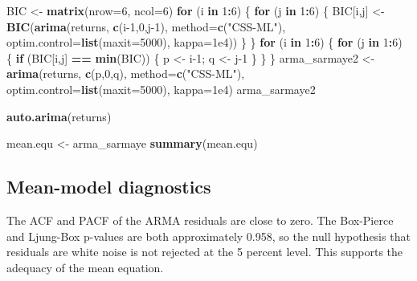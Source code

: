 \documentclass[
  11pt,
]{article}
\newenvironment{Shaded}{\begin{snugshade}}{\end{snugshade}}
\newcommand{\AttributeTok}[1]{\textcolor[rgb]{0.13,0.29,0.53}{#1}}
\newcommand{\ControlFlowTok}[1]{\textcolor[rgb]{0.13,0.29,0.53}{\textbf{#1}}}
\newcommand{\DecValTok}[1]{\textcolor[rgb]{0.00,0.00,0.81}{#1}}
\newcommand{\FloatTok}[1]{\textcolor[rgb]{0.00,0.00,0.81}{#1}}
\newcommand{\FunctionTok}[1]{\textcolor[rgb]{0.13,0.29,0.53}{\textbf{#1}}}
\newcommand{\NormalTok}[1]{#1}
\newcommand{\OtherTok}[1]{\textcolor[rgb]{0.56,0.35,0.01}{#1}}
\newcommand{\SpecialCharTok}[1]{\textcolor[rgb]{0.81,0.36,0.00}{\textbf{#1}}}
\newcommand{\StringTok}[1]{\textcolor[rgb]{0.31,0.60,0.02}{#1}}
\begin{document}
\begin{Shaded}
\begin{Highlighting}[]
\NormalTok{BIC }\OtherTok{\textless{}{-}} \FunctionTok{matrix}\NormalTok{(}\AttributeTok{nrow=}\DecValTok{6}\NormalTok{, }\AttributeTok{ncol=}\DecValTok{6}\NormalTok{)}
\ControlFlowTok{for}\NormalTok{ (i }\ControlFlowTok{in} \DecValTok{1}\SpecialCharTok{:}\DecValTok{6}\NormalTok{) \{}
  \ControlFlowTok{for}\NormalTok{ (j }\ControlFlowTok{in} \DecValTok{1}\SpecialCharTok{:}\DecValTok{6}\NormalTok{) \{}
\NormalTok{    BIC[i,j] }\OtherTok{\textless{}{-}} \FunctionTok{BIC}\NormalTok{(}\FunctionTok{arima}\NormalTok{(returns, }\FunctionTok{c}\NormalTok{(i}\DecValTok{{-}1}\NormalTok{,}\DecValTok{0}\NormalTok{,j}\DecValTok{{-}1}\NormalTok{), }\AttributeTok{method=}\FunctionTok{c}\NormalTok{(}\StringTok{"CSS{-}ML"}\NormalTok{),}
                          \AttributeTok{optim.control=}\FunctionTok{list}\NormalTok{(}\AttributeTok{maxit=}\DecValTok{5000}\NormalTok{), }\AttributeTok{kappa=}\FloatTok{1e4}\NormalTok{))}
\NormalTok{  \}}
\NormalTok{\}}
\ControlFlowTok{for}\NormalTok{ (i }\ControlFlowTok{in} \DecValTok{1}\SpecialCharTok{:}\DecValTok{6}\NormalTok{) \{}
  \ControlFlowTok{for}\NormalTok{ (j }\ControlFlowTok{in} \DecValTok{1}\SpecialCharTok{:}\DecValTok{6}\NormalTok{) \{}
    \ControlFlowTok{if}\NormalTok{ (BIC[i,j] }\SpecialCharTok{==} \FunctionTok{min}\NormalTok{(BIC)) \{ p }\OtherTok{\textless{}{-}}\NormalTok{ i}\DecValTok{{-}1}\NormalTok{; q }\OtherTok{\textless{}{-}}\NormalTok{ j}\DecValTok{{-}1}\NormalTok{ \}}
\NormalTok{  \}}
\NormalTok{\}}
\NormalTok{arma\_sarmaye2 }\OtherTok{\textless{}{-}} \FunctionTok{arima}\NormalTok{(returns, }\FunctionTok{c}\NormalTok{(p,}\DecValTok{0}\NormalTok{,q), }\AttributeTok{method=}\FunctionTok{c}\NormalTok{(}\StringTok{"CSS{-}ML"}\NormalTok{),}
                       \AttributeTok{optim.control=}\FunctionTok{list}\NormalTok{(}\AttributeTok{maxit=}\DecValTok{5000}\NormalTok{), }\AttributeTok{kappa=}\FloatTok{1e4}\NormalTok{)}
\NormalTok{arma\_sarmaye2}

\FunctionTok{auto.arima}\NormalTok{(returns)}

\NormalTok{mean.equ }\OtherTok{\textless{}{-}}\NormalTok{ arma\_sarmaye}
\FunctionTok{summary}\NormalTok{(mean.equ)}
\end{Highlighting}
\end{Shaded}

\subsection{Mean-model diagnostics}\label{mean-model-diagnostics}

The ACF and PACF of the ARMA residuals are close to zero. The Box-Pierce
and Ljung-Box p-values are both approximately 0.958, so the null
hypothesis that residuals are white noise is not rejected at the 5
percent level. This supports the adequacy of the mean equation.
\end{document}
